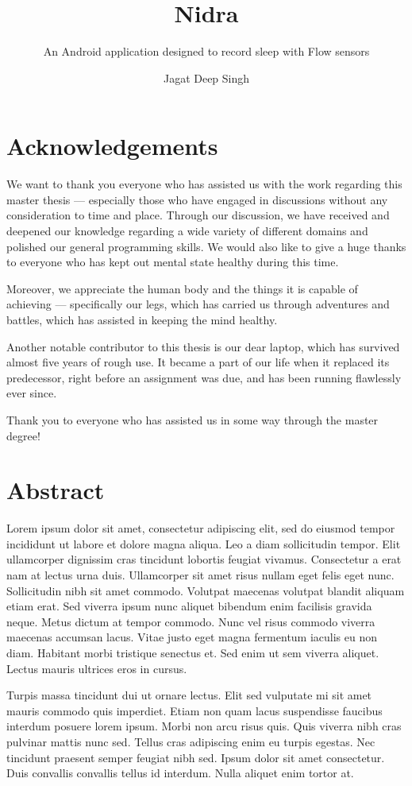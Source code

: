 \documentclass[USenglish,parskip=full]{ifimaster}
\title{Nidra}
\subtitle{An Android application designed to record sleep with Flow sensors}
\author{Jagat Deep Singh}
\date{} %
\begin{document}
\duoforside[dept={Department of Informatics}, program={Programming and Network}, long]{}
\frontmatter{}

\chapter*{Acknowledgements}
    We want to thank you everyone who has assisted us with the work regarding this master thesis — especially those who have engaged in discussions without any consideration to time and place. Through our discussion, we have received and deepened our knowledge regarding a wide variety of different domains and polished our general programming skills. We would also like to give a huge thanks to everyone who has kept out mental state healthy during this time. 

    Moreover, we appreciate the human body and the things it is capable of achieving — specifically our legs, which has carried us through adventures and battles, which has assisted in keeping the mind healthy.

    Another notable contributor to this thesis is our dear laptop, which has survived almost five years of rough use. It became a part of our life when it replaced its predecessor, right before an assignment was due, and has been running flawlessly ever since.

    Thank you to everyone who has assisted us in some way through the master degree!

\chapter*{Abstract}
    Lorem ipsum dolor sit amet, consectetur adipiscing elit, sed do eiusmod tempor incididunt ut labore et dolore magna aliqua. Leo a diam sollicitudin tempor. Elit ullamcorper dignissim cras tincidunt lobortis feugiat vivamus. Consectetur a erat nam at lectus urna duis. Ullamcorper sit amet risus nullam eget felis eget nunc. Sollicitudin nibh sit amet commodo. Volutpat maecenas volutpat blandit aliquam etiam erat. Sed viverra ipsum nunc aliquet bibendum enim facilisis gravida neque. Metus dictum at tempor commodo. Nunc vel risus commodo viverra maecenas accumsan lacus. Vitae justo eget magna fermentum iaculis eu non diam. Habitant morbi tristique senectus et. Sed enim ut sem viverra aliquet. Lectus mauris ultrices eros in cursus.

    Turpis massa tincidunt dui ut ornare lectus. Elit sed vulputate mi sit amet mauris commodo quis imperdiet. Etiam non quam lacus suspendisse faucibus interdum posuere lorem ipsum. Morbi non arcu risus quis. Quis viverra nibh cras pulvinar mattis nunc sed. Tellus cras adipiscing enim eu turpis egestas. Nec tincidunt praesent semper feugiat nibh sed. Ipsum dolor sit amet consectetur. Duis convallis convallis tellus id interdum. Nulla aliquet enim tortor at.
\end{document}
